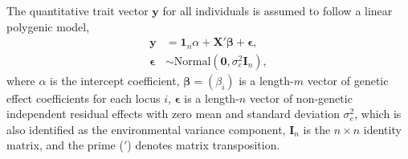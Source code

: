 \documentclass[11pt]{article}
\begin{document}
The quantitative trait vector $\mathbf{y}$ for all individuals is assumed to follow a linear polygenic model,
\begin{equation}
  \label{eq:trait}
  \begin{split}
    \mathbf{y}
    &=
      \mathbf{1}_n \alpha + \mathbf{X}' \boldsymbol{\beta}  + \boldsymbol{\epsilon}
      , \\
    \boldsymbol{\epsilon}
    &\sim
      \text{Normal} \left( \mathbf{0}, \sigma^2_e \mathbf{I}_n  \right)
      ,
  \end{split}
\end{equation}
where $\alpha$ is the intercept coefficient,
$\boldsymbol{\beta} = (\beta_i)$ is a length-$m$ vector of genetic effect coefficients for each locus $i$,
$\boldsymbol{\epsilon}$ is a length-$n$ vector of non-genetic independent residual effects with zero mean and standard deviation $\sigma^2_e$, which is also identified as the environmental variance component, $\mathbf{I}_n$ is the $n \times n$ identity matrix,
and the prime ($'$) denotes matrix transposition.
\end{document}
